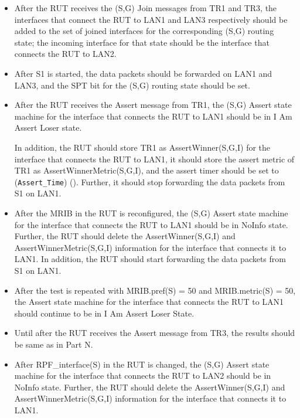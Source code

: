 \documentclass[11pt]{report}
\begin{document}

\begin{itemize}

  \item After the RUT receives the (S,G) Join messages from TR1 and TR3, the
  interfaces that connect the RUT to LAN1 and LAN3 respectively should be
  added to the set of joined interfaces for the corresponding (S,G) routing
  state; the incoming interface for that state should be the interface that
  connects the RUT to LAN2.

  \item After S1 is started, the data packets should be forwarded on LAN1 and
  LAN3, and the SPT bit for the (S,G) routing state should be set.

  \item After the RUT receives the Assert message from TR1, the (S,G)
  Assert state machine for the interface that connects the RUT to LAN1 should
  be in I Am Assert Loser state.

  In addition, the RUT should store TR1 as AssertWinner(S,G,I) for the
  interface that connects the RUT to LAN1, it should store the assert metric
  of TR1 as AssertWinnerMetric(S,G,I), and the assert timer should be set to
  (\verb=Assert_Time=) ({\PimsmAssertTime}).
  Further, it should stop forwarding the data packets from S1 on LAN1.

  \item After the MRIB in the RUT is reconfigured, the (S,G)
  Assert state machine for the interface that connects the RUT to LAN1 should
  be in NoInfo state.
  Further, the RUT should delete the AssertWinner(S,G,I) and
  AssertWinnerMetric(S,G,I) information for the interface that connects it to
  LAN1.
  In addition, the RUT should start forwarding the data packets from S1 on
  LAN1.

  \item After the test is repeated with MRIB.pref(S) = 50 and  MRIB.metric(S)
  = 50, the Assert state machine for the interface that connects the RUT to
  LAN1 should continue to be in I Am Assert Loser State.

\end{itemize}


\begin{itemize}

  \item Until after the RUT receives the Assert message from TR3, the
  results should be same as in Part N.

  \item After RPF\_interface(S) in the RUT is changed, the (S,G)
  Assert state machine for the interface that connects the RUT to LAN2 should
  be in NoInfo state.
  Further, the RUT should delete the AssertWinner(S,G,I) and
  AssertWinnerMetric(S,G,I) information for the interface that connects it to
  LAN1.

\end{itemize}
\end{document}
